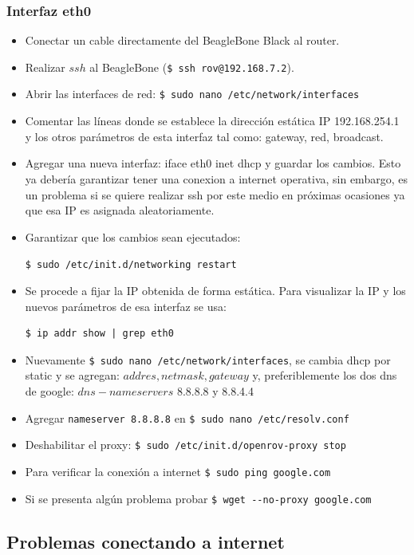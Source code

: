 \subsubsection{Interfaz eth0}
    \begin{itemize}
        \item Conectar un cable directamente del BeagleBone Black al router.
        \item Realizar $ssh$ al BeagleBone (\verb|$ ssh rov@192.168.7.2|).
        \item Abrir las interfaces de red: \verb|$ sudo nano /etc/network/interfaces|
        \item Comentar las líneas donde se establece la dirección estática IP 192.168.254.1 y los otros parámetros de esta interfaz tal como: gateway, red, broadcast. 
        \item Agregar una nueva interfaz: iface eth0 inet dhcp y guardar los cambios. Esto ya debería garantizar tener una conexion a internet operativa, sin embargo, es un problema si se quiere realizar ssh por este medio en próximas ocasiones ya que esa IP es asignada aleatoriamente.
        \item Garantizar que los cambios sean ejecutados:
        
        \verb|$ sudo /etc/init.d/networking restart|
        \item Se procede a fijar la IP obtenida de forma estática. Para visualizar la IP y los nuevos parámetros de esa interfaz se usa:
        
\begin{verbatim}
$ ip addr show | grep eth0
\end{verbatim}
        \item Nuevamente \verb|$ sudo nano /etc/network/interfaces|, se cambia dhcp por static y se agregan: $addres, netmask, gateway$ y, preferiblemente los dos dns de google: $dns-nameservers$ 8.8.8.8 y 8.8.4.4
        \item Agregar \verb|nameserver 8.8.8.8| en \verb|$ sudo nano /etc/resolv.conf| 
        \item Deshabilitar el proxy: \verb|$ sudo /etc/init.d/openrov-proxy stop| 
        \item Para verificar la conexión a internet \verb|$ sudo ping google.com|
        \item Si se presenta algún problema probar \verb|$ wget --no-proxy google.com|
    \end{itemize}

\subsection{Problemas conectando a internet}

